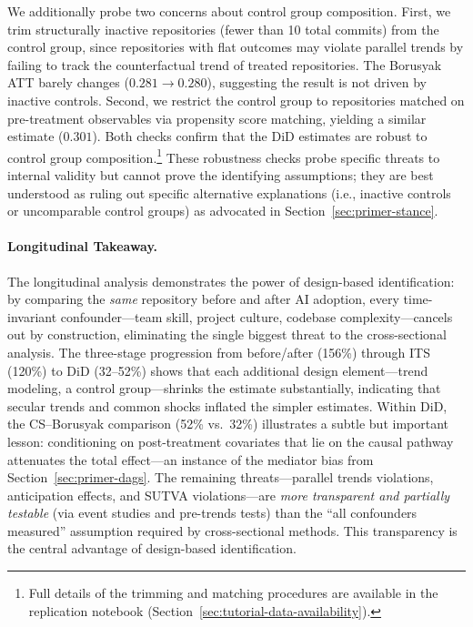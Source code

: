 We additionally probe two concerns about control group composition.
First, we trim structurally inactive repositories (fewer than 10 total commits) from the control group, since repositories with flat outcomes may violate parallel trends by failing to track the counterfactual trend of treated repositories.
The Borusyak ATT barely changes ($0.281 \to 0.280$), suggesting the result is not driven by inactive controls.
Second, we restrict the control group to repositories matched on pre-treatment observables via propensity score matching, yielding a similar estimate ($0.301$).
Both checks confirm that the DiD estimates are robust to control group composition.\footnote{Full details of the trimming and matching procedures are available in the replication notebook (Section~\ref{sec:tutorial-data-availability}).}
These robustness checks probe specific threats to internal validity but cannot prove the identifying assumptions; they are best understood as ruling out specific alternative explanations (i.e., inactive controls or uncomparable control groups) as advocated in Section~\ref{sec:primer-stance}.

\paragraph{Longitudinal Takeaway.}
\label{sec:longitudinal-takeaway}

The longitudinal analysis demonstrates the power of design-based identification: by comparing the \emph{same} repository before and after AI adoption, every time-invariant confounder---team skill, project culture, codebase complexity---cancels out by construction, eliminating the single biggest threat to the cross-sectional analysis.
The three-stage progression from before/after (156\%) through ITS (120\%) to DiD (32--52\%) shows that each additional design element---trend modeling, a control group---shrinks the estimate substantially, indicating that secular trends and common shocks inflated the simpler estimates.
Within DiD, the CS--Borusyak comparison (52\% vs.\ 32\%) illustrates a subtle but important lesson: conditioning on post-treatment covariates that lie on the causal pathway attenuates the total effect---an instance of the mediator bias from Section~\ref{sec:primer-dags}.
The remaining threats---parallel trends violations, anticipation effects, and SUTVA violations---are \emph{more transparent and partially testable} (via event studies and pre-trends tests) than the ``all confounders measured'' assumption required by cross-sectional methods.
This transparency is the central advantage of design-based identification.

